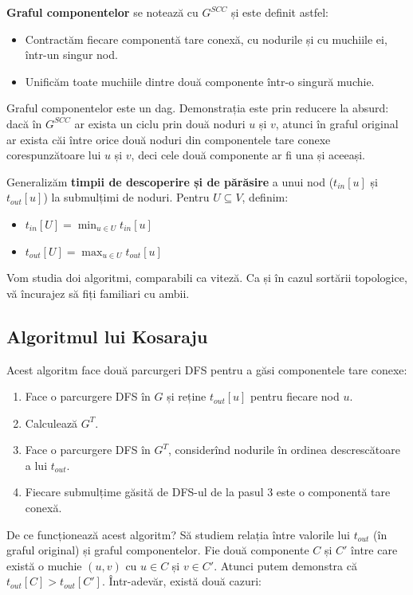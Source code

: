 \documentclass[../main.tex]{subfiles}
\begin{document}
\textbf{Graful componentelor} se notează cu $G^{SCC}$ și este definit astfel:

\begin{itemize}
  \item Contractăm fiecare componentă tare conexă, cu nodurile și cu muchiile ei, într-un singur nod.
  \item Unificăm toate muchiile dintre două componente într-o singură muchie.
\end{itemize}

Graful componentelor este un dag. Demonstrația este prin reducere la absurd: dacă în $G^{SCC}$ ar exista un ciclu prin două noduri $u$ și $v$, atunci în graful original ar exista căi între orice două noduri din componentele tare conexe corespunzătoare lui $u$ și $v$, deci cele două componente ar fi una și aceeași.

Generalizăm \textbf{timpii de descoperire și de părăsire} a unui nod ($t_{in}[u]$ și $t_{out}[u]$) la submulțimi de noduri. Pentru $U \subseteq V$, definim:

\begin{itemize}
  \item $t_{in}[U] = \min_{u \in U} t_{in}[u]$
  \item $t_{out}[U] = \max_{u \in U} t_{out}[u]$
\end{itemize}

Vom studia doi algoritmi, comparabili ca viteză. Ca și în cazul sortării topologice, vă încurajez să fiți familiari cu ambii.

\subsection{Algoritmul lui Kosaraju}

Acest algoritm face două parcurgeri DFS pentru a găsi componentele tare conexe:

\begin{enumerate}
  \item Face o parcurgere DFS în $G$ și reține $t_{out}[u]$ pentru fiecare nod $u$.
  \item Calculează $G^{T}$.
  \item Face o parcurgere DFS în $G^{T}$, considerînd nodurile în ordinea descrescătoare a lui $t_{out}$.
  \item Fiecare submulțime găsită de DFS-ul de la pasul 3 este o componentă tare conexă.
\end{enumerate}

De ce funcționează acest algoritm? Să studiem relația între valorile lui $t_{out}$ (în graful original) și graful componentelor. Fie două componente $C$ și $C'$ între care există o muchie $(u, v)$ cu $u \in C$ și $v \in C'$. Atunci putem demonstra că $t_{out}[C] > t_{out}[C']$. Într-adevăr, există două cazuri:
\end{document}
